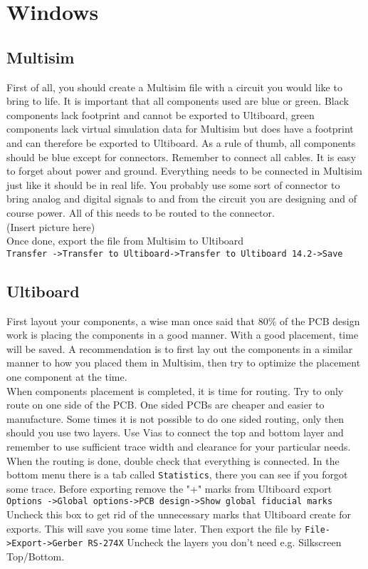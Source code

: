 \section{Windows}%
\label{sec:windows}
 \subsection{Multisim}
 First of all, you should create a Multisim file with a circuit you would like to bring to life. It is important that all components used are blue or green. Black components lack footprint and cannot be exported to Ultiboard, green components lack virtual simulation data for Multisim but does have a footprint and can therefore be exported to Ultiboard. As a rule of thumb, all components should be blue except for connectors. Remember to connect all cables. It is easy to forget about power and ground. Everything needs to be connected in Multisim just like it should be in real life. You probably use some sort of connector to bring analog and digital signals to and from the circuit you are designing and of course power. All of this needs to be routed to the connector.\\
 
 (Insert picture here)\\
Once done, export the file from Multisim to Ultiboard\\
\verb|Transfer ->Transfer to Ultiboard->Transfer to Ultiboard 14.2->Save|\\
 
\subsection{Ultiboard}
First layout your components, a wise man once said that 80\% of the PCB design work is placing the components in a good manner. With a good placement, time will be saved. A recommendation is to first lay out the components in a similar manner to how you placed them in Multisim, then try to optimize the placement one component at the time.\\
When components placement is completed, it is time for routing. Try to only route on one side of the PCB. One sided PCBs are cheaper and easier to manufacture. Some times it is not possible to do one sided routing, only then should you use two layers. Use Vias to connect the top and bottom layer and remember to use sufficient trace width and clearance for your particular needs. When the routing is done, double check that everything is connected. In the bottom menu there is a tab called \verb|Statistics|, there you can see if you forgot some trace. Before exporting remove the "+" marks from Ultiboard export\\
\verb|Options ->Global options->PCB design->Show global fiducial marks|\\
Uncheck this box to get rid of the unnecessary marks that Ultiboard create for exports. This will save you some time later.
Then export the file by
\verb|File->Export->Gerber RS-274X|
Uncheck the layers you don't need e.g. Silkscreen Top/Bottom.

